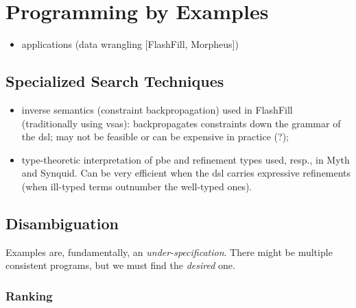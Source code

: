 \section{Programming by Examples}
\label{sec:pbe}

\begin{itemize}
\item applications (data wrangling [FlashFill, Morpheus])
\end{itemize}

\subsection{Specialized Search Techniques}
\label{sec:pbe-search-techniques}


\begin{itemize}
\item inverse semantics (constraint backpropagation) used in FlashFill
(traditionally using \glspl{vsa}): backpropagates constraints down the grammar of
the \gls{dsl}; may not be feasible or can be expensive in practice (?);
\item type-theoretic interpretation of \gls{pbe} and refinement types used, resp.,
in Myth and Synquid. Can be very efficient when the \gls{dsl} carries expressive
refinements (when ill-typed terms outnumber the well-typed ones).
\end{itemize}

\subsection{Disambiguation}
\label{sec:resolving-ambiguity}

Examples are, fundamentally, an \textit{under-specification}. There might be
multiple consistent programs, but we must find the \textit{desired} one.

\subsubsection{Ranking}

